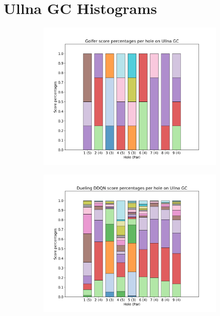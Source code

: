 \documentclass{kththesis}
\begin{document}
\chapter{Ullna GC Histograms}
\label{app:ullna_histograms}
\begin{figure}
    \centering
    \begin{subfigure}{\textwidth}
    \centering
    \includegraphics[height=0.3\textheight]{L2Percentages/L2_Score_Percentages_Ullna.png} 
    \end{subfigure}
    \begin{subfigure}{\textwidth}
    \centering
    \includegraphics[height=0.3\textheight]{AgentPercentages/DDDQN_Score_Percentages_Ullna.png} 

\end{subfigure}
\end{figure}
\end{document}
